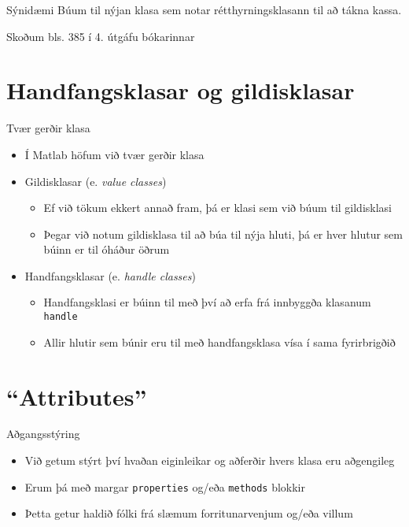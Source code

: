 \documentclass{beamer}
\begin{document}
\begin{frame}{Sýnidæmi}
Búum til nýjan klasa sem notar rétthyrningsklasann til að tákna kassa.

\vspace{1cm}
Skoðum bls. 385 í 4. útgáfu bókarinnar
\end{frame}

\section{Handfangsklasar og gildisklasar}

\begin{frame}{Tvær gerðir klasa}
\begin{itemize}
 \item Í Matlab höfum við tvær gerðir klasa
 \item Gildisklasar (e. \emph{value classes})
 \begin{itemize}
  \item Ef við tökum ekkert annað fram, þá er klasi sem við búum til gildisklasi
  \item Þegar við notum gildisklasa til að búa til nýja hluti, þá er hver hlutur sem búinn er til óháður öðrum
 \end{itemize}
 \item Handfangsklasar (e. \emph{handle classes})
 \begin{itemize}
  \item Handfangsklasi er búinn til með því að erfa frá innbyggða klasanum \texttt{handle}
  \item Allir hlutir sem búnir eru til með handfangsklasa vísa í sama fyrirbrigðið
 \end{itemize}
\end{itemize}
\end{frame}

\section{``Attributes''}

\begin{frame}{Aðgangsstýring}
\begin{itemize}
 \item Við getum stýrt því hvaðan eiginleikar og aðferðir hvers klasa eru aðgengileg
 \item Erum þá með margar \texttt{properties} og/eða \texttt{methods} blokkir
 \item Þetta getur haldið fólki frá slæmum forritunarvenjum og/eða villum
\end{itemize}
\end{frame}
\end{document}
